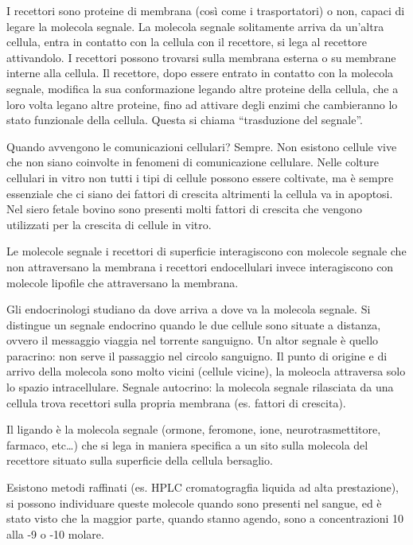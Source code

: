 \documentclass[]{article}
\begin{document}
I recettori sono proteine di membrana (così come i trasportatori) o non,
capaci di legare la molecola segnale. La molecola segnale solitamente
arriva da un'altra cellula, entra in contatto con la cellula con il
recettore, si lega al recettore attivandolo. I recettori possono
trovarsi sulla membrana esterna o su membrane interne alla cellula. Il
recettore, dopo essere entrato in contatto con la molecola segnale,
modifica la sua conformazione legando altre proteine della cellula, che
a loro volta legano altre proteine, fino ad attivare degli enzimi che
cambieranno lo stato funzionale della cellula. Questa si chiama
``trasduzione del segnale''.

Quando avvengono le comunicazioni cellulari? Sempre. Non esistono
cellule vive che non siano coinvolte in fenomeni di comunicazione
cellulare. Nelle colture cellulari in vitro non tutti i tipi di cellule
possono essere coltivate, ma è sempre essenziale che ci siano dei
fattori di crescita altrimenti la cellula va in apoptosi. Nel siero
fetale bovino sono presenti molti fattori di crescita che vengono
utilizzati per la crescita di cellule in vitro.

Le molecole segnale i recettori di superficie interagiscono con molecole
segnale che non attraversano la membrana i recettori endocellulari
invece interagiscono con molecole lipofile che attraversano la membrana.

Gli endocrinologi studiano da dove arriva a dove va la molecola segnale.
Si distingue un segnale endocrino quando le due cellule sono situate a
distanza, ovvero il messaggio viaggia nel torrente sanguigno. Un altor
segnale è quello paracrino: non serve il passaggio nel circolo
sanguigno. Il punto di origine e di arrivo della molecola sono molto
vicini (cellule vicine), la moleocla attraversa solo lo spazio
intracellulare. Segnale autocrino: la molecola segnale rilasciata da una
cellula trova recettori sulla propria membrana (es. fattori di
crescita).

Il ligando è la molecola segnale (ormone, feromone, ione,
neurotrasmettitore, farmaco, etc\ldots{}) che si lega in maniera
specifica a un sito sulla molecola del recettore situato sulla
superficie della cellula bersaglio.

Esistono metodi raffinati (es. HPLC cromatogragfia liquida ad alta
prestazione), si possono individuare queste molecole quando sono
presenti nel sangue, ed è stato visto che la maggior parte, quando
stanno agendo, sono a concentrazioni 10 alla -9 o -10 molare.
\end{document}
